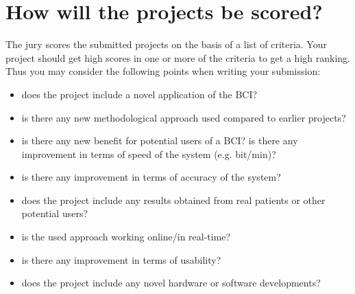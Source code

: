 \section{How will the projects be scored?}

The jury scores the submitted projects on the basis of a list of criteria. Your project should get high scores in one or more of the criteria to get a high ranking. Thus you may consider the following points when writing your submission:

\begin{itemize}
    \item does the project include a novel application of the BCI?
    \item is there any new methodological approach used compared to earlier projects?
    \item is there any new benefit for potential users of a BCI?
    is there any improvement in terms of speed of the system (e.g. bit/min)?
    \item is there any improvement in terms of accuracy of the system?
    \item does the project include any results obtained from real patients or other potential users?
    \item is the used approach working online/in real-time?
    \item is there any improvement in terms of usability?
    \item does the project include any novel hardware or software developments?
\end{itemize}